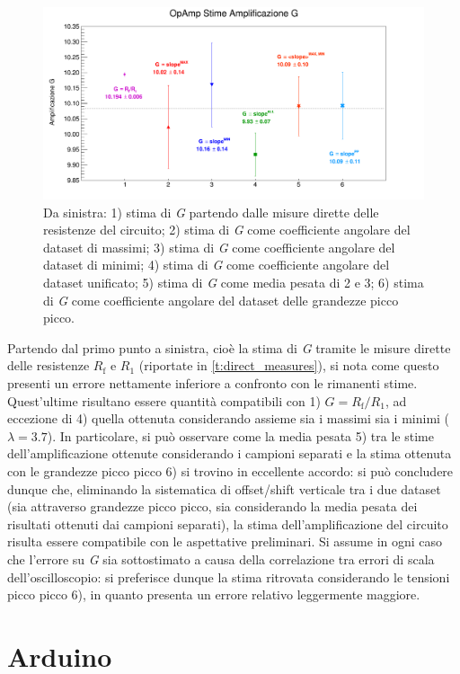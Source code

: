 \documentclass[a4paper,11pt]{article} %
\begin{document}
\begin{figure}[H]
	\centering
	\includegraphics[width=15cm]{../Plots/Report_Plots/opamp_comp.png}
	\caption{Da sinistra: 1) stima di \textit{G} partendo dalle misure dirette delle resistenze del circuito;
	2) stima di \textit{G} come coefficiente angolare del dataset di massimi; 3) stima di \textit{G} come coefficiente 
	angolare del dataset di minimi; 4) stima di \textit{G} come coefficiente angolare del dataset unificato; 
	5) stima di \textit{G} come media pesata di 2 e 3; 6) stima di \textit{G} come coefficiente angolare del dataset delle 
	grandezze picco picco.}
	\label{i:opamp_comp}
\end{figure}

\noindent Partendo dal primo punto a sinistra, cioè la stima di \textit{G} tramite le misure dirette delle resistenze
$R_{\text{f}}$ e $R_{1}$ (riportate in \autoref{t:direct_measures}), si nota come questo presenti un errore nettamente
inferiore a confronto con le rimanenti stime. Quest'ultime risultano essere quantità compatibili con 1)
$G=R_{\text{f}}/R_{1}$, ad eccezione di 4) quella ottenuta considerando assieme sia i massimi sia i minimi ($\lambda =
3.7$). In particolare, si può osservare come la media pesata 5) tra le stime dell'amplificazione ottenute considerando i
campioni separati e la stima ottenuta con le grandezze picco picco 6) si trovino in eccellente accordo: si può concludere
dunque che, eliminando la sistematica di offset/shift verticale tra i due dataset (sia attraverso grandezze picco picco,
sia considerando la media pesata dei risultati ottenuti dai campioni separati), la stima dell'amplificazione del
circuito risulta essere compatibile con le aspettative preliminari. Si assume in ogni caso che l'errore su \textit{G}
sia sottostimato a causa della correlazione tra errori di scala dell'oscilloscopio: si preferisce dunque la stima
ritrovata considerando le tensioni picco picco 6), in quanto presenta un errore relativo leggermente maggiore.



\section{Arduino}
\end{document}
